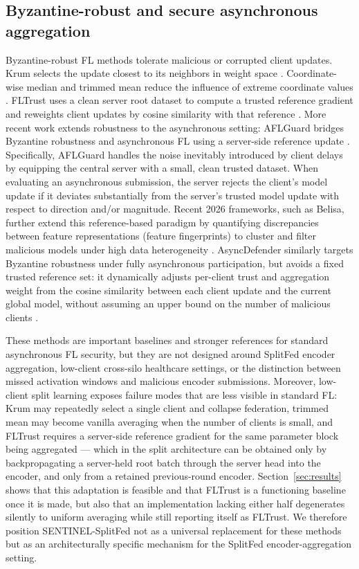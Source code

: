\documentclass[pdflatex,sn-mathphys-num]{sn-jnl}
\begin{document}
\subsection{Byzantine-robust and secure asynchronous aggregation}

Byzantine-robust FL methods tolerate malicious or corrupted client updates. Krum selects the update closest to its neighbors in weight space \cite{blanchard2017machine}. Coordinate-wise median and trimmed mean reduce the influence of extreme coordinate values \cite{yin2018byzantine}. FLTrust uses a clean server root dataset to compute a trusted reference gradient and reweights client updates by cosine similarity with that reference \cite{cao2021fltrust}. More recent work extends robustness to the asynchronous setting: AFLGuard bridges Byzantine robustness and asynchronous FL using a server-side reference update \cite{fang2022aflguard}. Specifically, AFLGuard handles the noise inevitably introduced by client delays by equipping the central server with a small, clean trusted dataset. When evaluating an asynchronous submission, the server rejects the client's model update if it deviates substantially from the server's trusted model update with respect to direction and/or magnitude. Recent 2026 frameworks, such as Belisa, further extend this reference-based paradigm by quantifying discrepancies between feature representations (feature fingerprints) to cluster and filter malicious models under high data heterogeneity \cite{peng2026belisa}. AsyncDefender similarly targets Byzantine robustness under fully asynchronous participation, but avoids a fixed trusted reference set: it dynamically adjusts per-client trust and aggregation weight from the cosine similarity between each client update and the current global model, without assuming an upper bound on the number of malicious clients \cite{asyncdefender2025}.

These methods are important baselines and stronger references for standard asynchronous FL security, but they are not designed around SplitFed encoder aggregation, low-client cross-silo healthcare settings, or the distinction between missed activation windows and malicious encoder submissions. Moreover, low-client split learning exposes failure modes that are less visible in standard FL: Krum may repeatedly select a single client and collapse federation, trimmed mean may become vanilla averaging when the number of clients is small, and FLTrust requires a server-side reference gradient for the same parameter block being aggregated --- which in the split architecture can be obtained only by backpropagating a server-held root batch through the server head into the encoder, and only from a retained previous-round encoder. Section~\ref{sec:results} shows that this adaptation is feasible and that FLTrust is a functioning baseline once it is made, but also that an implementation lacking either half degenerates silently to uniform averaging while still reporting itself as FLTrust. We therefore position SENTINEL-SplitFed not as a universal replacement for these methods but as an architecturally specific mechanism for the SplitFed encoder-aggregation setting.
\end{document}
